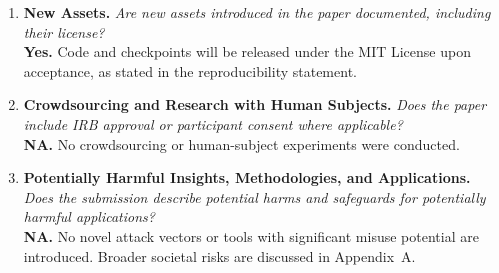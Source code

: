 \documentclass{article}
\begin{document}
\begin{enumerate}
\item \textbf{New Assets.}
\textit{Are new assets introduced in the paper documented, including their license?}\\
\textbf{Yes.} Code and checkpoints will be released under the MIT License upon acceptance, as stated in the reproducibility statement.

\item \textbf{Crowdsourcing and Research with Human Subjects.}
\textit{Does the paper include IRB approval or participant consent where applicable?}\\
\textbf{NA.} No crowdsourcing or human-subject experiments were conducted.

\item \textbf{Potentially Harmful Insights, Methodologies, and Applications.}
\textit{Does the submission describe potential harms and safeguards for potentially harmful applications?}\\
\textbf{NA.} No novel attack vectors or tools with significant misuse potential are introduced. Broader societal risks are discussed in Appendix~A.

\end{enumerate}
\end{document}

